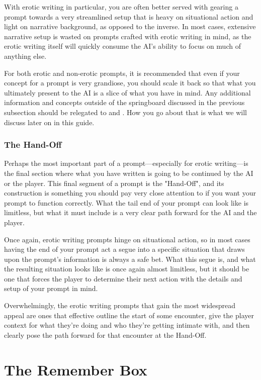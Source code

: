 ﻿\documentclass[Coomer-main.tex]{subfiles}
\begin{document}
With erotic writing in particular, you are often better served with gearing a prompt towards a very streamlined setup that is heavy on situational action and light on narrative background, as opposed to the inverse. In most cases, extensive narrative setup is wasted on prompts crafted with erotic writing in mind, as the erotic writing itself will quickly consume the AI's ability to focus on much of anything else.

For both erotic and non-erotic prompts, it is recommended that even if your concept for a prompt is very grandiose, you should scale it back so that what you ultimately present to the AI is a slice of what you have in mind. Any additional information and concepts outside of the springboard discussed in the previous subsection should be relegated to \rem and \wi. How you go about that is what we will discuss later on in this guide.

\subsection{The Hand-Off}

Perhaps the most important part of a prompt—especially for erotic writing—is the final section where what you have written is going to be continued by the AI or the player. This final segment of a prompt is the "Hand-Off", and its construction is something you should pay very close attention to if you want your prompt to function correctly. What the tail end of your prompt can look like is limitless, but what it must include is a very clear path forward for the AI and the player.

Once again, erotic writing prompts hinge on situational action, so in most cases having the end of your prompt act a segue into a specific situation that draws upon the prompt's information is always a safe bet. What this segue is, and what the resulting situation looks like is once again almost limitless, but it should be one that forces the player to determine their next action with the details and setup of your prompt in mind.

Overwhelmingly, the erotic writing prompts that gain the most widespread appeal are ones that effective outline the start of some encounter, give the player context for what they're doing and who they're getting intimate with, and then clearly pose the path forward for that encounter at the Hand-Off.

\chapter{The Remember Box}
\end{document}
